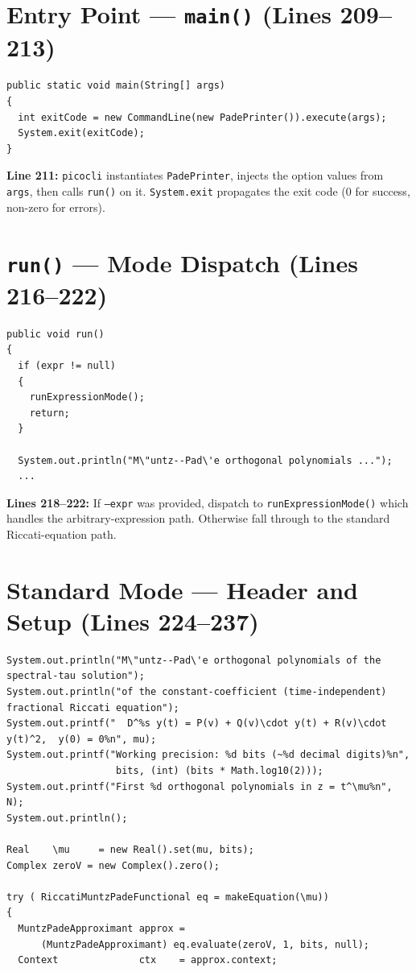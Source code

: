\documentclass[a4paper,11pt]{article}
\begin{document}
\section{Entry Point --- \texttt{main()} (Lines 209--213)}

\begin{lstlisting}[firstnumber=209]
public static void main(String[] args)
{
  int exitCode = new CommandLine(new PadePrinter()).execute(args);
  System.exit(exitCode);
}
\end{lstlisting}

\textbf{Line 211:} \texttt{picocli} instantiates \texttt{PadePrinter}, injects
the option values from \texttt{args}, then calls \texttt{run()} on it.
\texttt{System.exit} propagates the exit code (0 for success, non-zero for
errors).

\section{\texttt{run()} --- Mode Dispatch (Lines 216--222)}

\begin{lstlisting}[firstnumber=216]
public void run()
{
  if (expr != null)
  {
    runExpressionMode();
    return;
  }

  System.out.println("M\"untz--Pad\'e orthogonal polynomials ...");
  ...
\end{lstlisting}

\textbf{Lines 218--222:} If \texttt{--expr} was provided, dispatch to
\texttt{runExpressionMode()} which handles the arbitrary-expression path.
Otherwise fall through to the standard Riccati-equation path.

\newpage

\section{Standard Mode --- Header and Setup (Lines 224--237)}

\begin{lstlisting}[firstnumber=224]
System.out.println("M\"untz--Pad\'e orthogonal polynomials of the spectral-tau solution");
System.out.println("of the constant-coefficient (time-independent) fractional Riccati equation");
System.out.printf("  D^%s y(t) = P(v) + Q(v)\cdot y(t) + R(v)\cdot y(t)^2,  y(0) = 0%n", mu);
System.out.printf("Working precision: %d bits (~%d decimal digits)%n",
                   bits, (int) (bits * Math.log10(2)));
System.out.printf("First %d orthogonal polynomials in z = t^\mu%n", N);
System.out.println();

Real    \mu     = new Real().set(mu, bits);
Complex zeroV = new Complex().zero();

try ( RiccatiMuntzPadeFunctional eq = makeEquation(\mu))
{
  MuntzPadeApproximant approx =
      (MuntzPadeApproximant) eq.evaluate(zeroV, 1, bits, null);
  Context              ctx    = approx.context;
\end{lstlisting}
\end{document}

